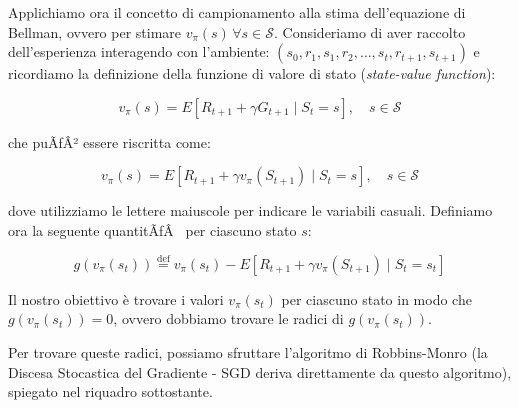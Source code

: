 ﻿\documentclass[11pt, a4paper]{report}
\begin{document}
Applichiamo ora il concetto di campionamento alla stima dell'equazione di Bellman, ovvero per stimare $v_\pi(s) \, \forall s \in \mathcal{S}$. Consideriamo di aver raccolto dell'esperienza interagendo con l'ambiente: $(s_0, r_1, s_1, r_2, \dots, s_t, r_{t+1}, s_{t+1})$ e ricordiamo la definizione della funzione di valore di stato (\emph{state-value function}):

\[
v_\pi(s) = E[R_{t+1} + \gamma G_{t+1} \mid S_t = s], \quad s \in \mathcal{S}
\]

che puÃƒÂ² essere riscritta come:

\[
v_\pi(s) = E[R_{t+1} + \gamma v_\pi(S_{t+1}) \mid S_t = s], \quad s \in \mathcal{S}
\]

dove utilizziamo le lettere maiuscole per indicare le variabili casuali. Definiamo ora la seguente quantitÃƒÂ  per ciascuno stato $s$:

\[
g(v_\pi(s_t)) \overset{\text{def}}{=} v_\pi(s_t) - E[R_{t+1} + \gamma v_\pi(S_{t+1}) \mid S_t = s_t] \tag{5.2}
\]

Il nostro obiettivo è trovare i valori $v_\pi(s_t)$ per ciascuno stato in modo che $g(v_\pi(s_t)) = 0$, ovvero dobbiamo trovare le radici di $g(v_\pi(s_t))$.

Per trovare queste radici, possiamo sfruttare l'algoritmo di Robbins-Monro (la Discesa Stocastica del Gradiente - SGD deriva direttamente da questo algoritmo), spiegato nel riquadro sottostante.

\newpage
\end{document}
